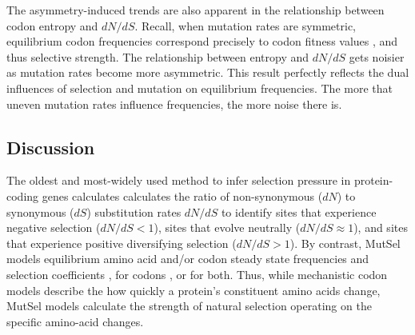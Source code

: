\documentclass[11pt]{article}
\begin{document}
The asymmetry-induced trends are also apparent in the relationship between codon entropy and $dN/dS$. Recall, when mutation rates are symmetric, equilibrium codon frequencies correspond precisely to codon fitness values \cite{SellaHirsh2005}, and thus selective strength. The relationship between entropy and $dN/dS$ gets noisier as mutation rates become more asymmetric. This result perfectly reflects the dual influences of selection and mutation on equilibrium frequencies. The more that uneven mutation rates influence frequencies, the more noise there is. 


\subsection*{Discussion}




The oldest and most-widely used method to infer selection pressure in protein-coding genes calculates calculates the ratio of non-synonymous ($dN$) to synonymous ($dS$) substitution rates $dN/dS$ to identify sites that experience negative selection ($dN/dS<1$), sites that evolve neutrally ($dN/dS\approx1$), and sites that experience positive diversifying selection ($dN/dS>1$). By contrast, MutSel models equilibrium amino acid and/or codon steady state frequencies and selection coefficients \cite{HalpernBruno1998,NielsenYang2008,Rodrigueetal2010,Tamurietal2012,Tamurietal2014}, for codons \cite{YangNielsen2008}, or for both. Thus, while mechanistic codon models describe the how quickly a protein's constituent amino acids change, MutSel models calculate the strength of natural selection operating on the specific amino-acid changes.  
\end{document}
